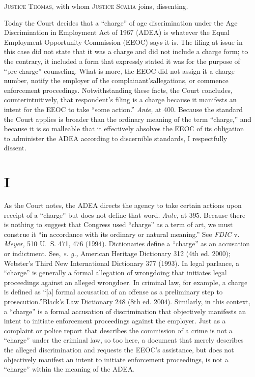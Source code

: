
\setcounter{page}{408}

  \textsc{Justice Thomas,} with whom \textsc{Justice Scalia} joins, dissenting.

  Today the Court decides that a ``charge'' of age discrimination
under the Age Discrimination in Employment Act of 1967 (ADEA) is
whatever the Equal Employment Opportunity Commission (EEOC) says it is.
The filing at issue in this case did not state that it was a charge
and did not include a charge form; to the contrary, it included a
form that expressly stated it was for the purpose of ``pre-charge''
counseling. What is more, the EEOC did not assign it a charge number,
notify the employer of the complainant's\footnotemark[1] allegations, or commence
enforcement proceedings. Notwithstanding these facts, the Court
concludes, counterintuitively, that respondent's filing is a charge
because it manifests an intent for the EEOC to take ``some action.''
\emph{Ante,} at 400. Because the standard the Court applies is broader
than the ordinary meaning of the term ``charge,'' and because it is
so malleable that it effectively absolves the EEOC of its obligation to
administer the ADEA according to discernible standards, I respectfully
dissent.

\section{I}

  As the Court notes, the ADEA directs the agency to take certain
actions upon receipt of a ``charge'' but does not define that word.
\emph{Ante,} at 395. Because there is nothing to suggest that Congress used
``charge'' as a term of art, we must construe it ``in accordance
with its ordinary or natural meaning.'' See \emph{FDIC} v. \emph{Meyer,}
510 U.~S. 471, 476 (1994). Dictionaries define a ``charge'' as an
accusation or indictment. \newpage  See, \emph{e. g.,} American Heritage
Dictionary 312 (4th ed. 2000); Webster's Third New International
Dictionary 377 (1993). In legal parlance, a ``charge'' is generally
a formal allegation of wrongdoing that initiates legal proceedings
against an alleged wrongdoer. In criminal law, for example, a charge
is defined as ``[a] formal accusation of an offense as a preliminary
step to prosecution.''Black's Law Dictionary 248 (8th ed. 2004).
Similarly, in this context, a ``charge'' is a formal accusation
of discrimination that objectively manifests an intent to initiate
enforcement proceedings against the employer. Just as a complaint
or police report that describes the commission of a crime is not a
``charge'' under the criminal law, so too here, a document that
merely describes the alleged discrimination and requests the EEOC's
assistance, but does not objectively manifest an intent to initiate
enforcement proceedings, is not a ``charge'' within the meaning of the
ADEA.

